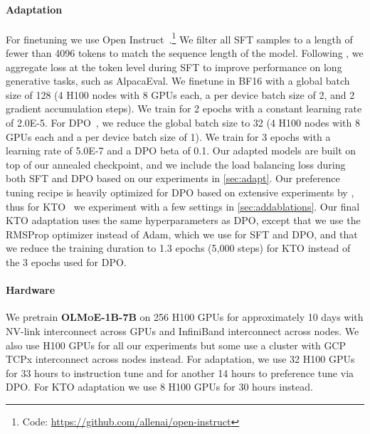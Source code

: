 \documentclass{article}
\newcommand{\modelsmall}{\textbf{\textsc{OLMoE-1B-7B}}}
\begin{document}
\paragraph{Adaptation} For finetuning we use Open Instruct~\citep{wang2023far, ivison2023camels}.\footnote{Code: \url{https://github.com/allenai/open-instruct}} We filter all SFT samples to a length of fewer than 4096 tokens to match the sequence length of the model. Following \citet{muennighoff2024generativerepresentationalinstructiontuning}, we aggregate loss at the token level during SFT to improve performance on long generative tasks, such as AlpacaEval. We finetune in BF16 with a global batch size of 128 (4 H100 nodes with 8 GPUs each, a per device batch size of 2, and 2 gradient accumulation steps). We train for 2 epochs with a constant learning rate of 2.0E-5. For DPO~\citep{rafailov2023direct}, we reduce the global batch size to 32 (4 H100 nodes with 8 GPUs each and a per device batch size of 1). We train for 3 epochs with a learning rate of 5.0E-7 and a DPO beta of 0.1. Our adapted models are built on top of our annealed checkpoint, and we include the load balancing loss during both SFT and DPO based on our experiments in \autoref{sec:adapt}. Our preference tuning recipe is heavily optimized for DPO based on extensive experiments by \citet{ivison2023camels}, thus for KTO~\citep{ethayarajh2024kto} we experiment with a few settings in \autoref{sec:addablations}. Our final KTO adaptation uses the same hyperparameters as DPO, except that we use the RMSProp optimizer instead of Adam, which we use for SFT and DPO, and that we reduce the training duration to 1.3 epochs (5,000 steps) for KTO instead of the 3 epochs used for DPO.

\paragraph{Hardware} We pretrain \modelsmall{} on 256 H100 GPUs for approximately 10 days with NV-link interconnect across GPUs and InfiniBand interconnect across nodes. We also use H100 GPUs for all our experiments but some use a cluster with GCP TCPx interconnect across nodes instead. For adaptation, we use 32 H100 GPUs for 33 hours to instruction tune and for another 14 hours to preference tune via DPO. For KTO adaptation we use 8 H100 GPUs for 30 hours instead.
\end{document}
